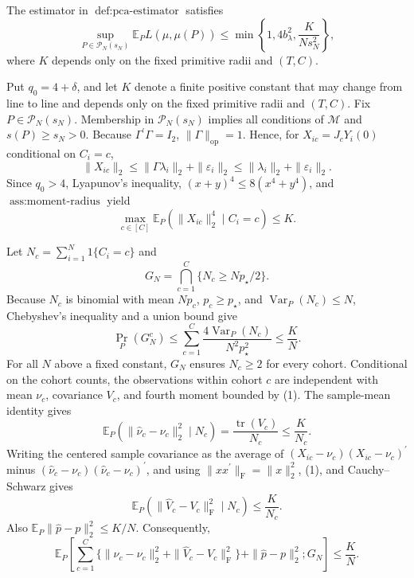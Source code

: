 The estimator in \(\operatorname{def:pca\text{-}estimator}\) satisfies
\[
\sup_{P\in\mathcal P_N(s_N)}
\mathbb E_P L(\widehat\mu,\mu(P))
\le \min\!\left\{1,4b_\lambda^2,\frac{K}{Ns_N^2}\right\},
\]
where \(K\) depends only on the fixed primitive radii and \((T,C)\).

Put \(q_0=4+\delta\), and let \(K\) denote a finite positive constant that may change from line to line and depends only on the fixed primitive radii and \((T,C)\).  Fix \(P\in\mathcal P_N(s_N)\).  Membership in \(\mathcal P_N(s_N)\) implies all conditions of \(\mathcal M\) and \(s(P)\ge s_N>0\).  Because \(\Gamma^{\prime}\Gamma=I_2\), \(\|\Gamma\|_{\mathrm{op}}=1\).  Hence, for \(X_{ic}=J_cY_i(0)\) conditional on \(C_i=c\),
\[
\|X_{ic}\|_2
\le \|\Gamma\lambda_i\|_2+\|\varepsilon_i\|_2
\le \|\lambda_i\|_2+\|\varepsilon_i\|_2.
\]
Since \(q_0>4\), Lyapunov's inequality, \((x+y)^4\le8(x^4+y^4)\), and \(\operatorname{ass:moment\text{-}radius}\) yield
\[
\max_{c\in[C]}
\mathbb E_P(\|X_{ic}\|_2^4\mid C_i=c)\le K.
\tag{1}
\]

Let \(N_c=\sum_{i=1}^N1\{C_i=c\}\) and
\[
G_N=\bigcap_{c=1}^C\{N_c\ge Np_\star/2\}.
\]
Because \(N_c\) is binomial with mean \(Np_c\), \(p_c\ge p_\star\), and \(\operatorname{Var}_P(N_c)\le N\), Chebyshev's inequality and a union bound give
\[
\Pr_P(G_N^c)
\le \sum_{c=1}^C
\frac{4\operatorname{Var}_P(N_c)}{N^2p_\star^2}
\le \frac{K}{N}.
\tag{2}
\]
For all \(N\) above a fixed constant, \(G_N\) ensures \(N_c\ge2\) for every cohort. Conditional on the cohort counts, the observations within cohort \(c\) are independent with mean \(\nu_c\), covariance \(V_c\), and fourth moment bounded by (1).  The sample-mean identity gives
\[
\mathbb E_P(\|\widehat\nu_c-\nu_c\|_2^2\mid N_c)
=\frac{\operatorname{tr}(V_c)}{N_c}\le\frac K{N_c}.
\]
Writing the centered sample covariance as the average of
\((X_{ic}-\nu_c)(X_{ic}-\nu_c)^{\prime}\) minus
\((\widehat\nu_c-\nu_c)(\widehat\nu_c-\nu_c)^{\prime}\), and using
\(\|xx^{\prime}\|_{\mathrm F}=\|x\|_2^2\), (1), and Cauchy--Schwarz gives
\[
\mathbb E_P(\|\widehat V_c-V_c\|_{\mathrm F}^2\mid N_c)
\le\frac K{N_c}.
\]
Also \(\mathbb E_P\|\widehat p-p\|_2^2\le K/N\).  Consequently,
\[
\mathbb E_P\!\left[
\sum_{c=1}^C\{\|\widehat\nu_c-\nu_c\|_2^2
+\|\widehat V_c-V_c\|_{\mathrm F}^2\}
+\|\widehat p-p\|_2^2;G_N\right]
\le\frac K N.
\tag{3}
\]


